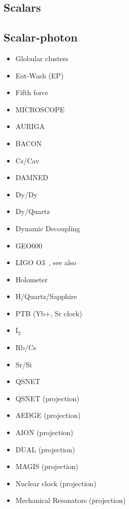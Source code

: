 \documentclass[8pt,twocolumn]{extarticle}
\begin{document}
\begin{mdframed}
\vspace{-1em}
\section{Scalars}\vspace{-0.5em}

\subsection*{Scalar-photon}\vspace{-0.5em}
\begin{itemize}\setlength\itemsep{-0.5em}
	\item Globular clusters~\cite{Dolan:2022kul}
	\item Eot-Wash (EP)~\cite{Hees:2018fpg}
	\item Fifth force~\cite{Adelberger:2003zx,Fischbach:1996eq,Fienga:2023ocw,Mars}
	\item MICROSCOPE~\cite{Berge:2017ovy}
	\item AURIGA~\cite{Branca:2016rez}
	\item BACON~\cite{BACON}
	\item Cs/Cav~\cite{Tretiak:2022ndx}
	\item DAMNED~\cite{Savalle:2020vgz}
	\item Dy/Dy~\cite{VanTilburg:2015oza}
	\item Dy/Quartz~\cite{Zhang:2022ewz}
	\item Dynamic Decoupling~\cite{Aharony:2019iad}
	\item GEO600~\cite{Vermeulen:2021epa}
	\item LIGO O3~\cite{Gottel:2024cfj}, see also~\cite{Fukusumi:2023kqd}
	\item Holometer~\cite{Aiello:2021wlp}
	\item H/Quartz/Sapphire~\cite{Campbell:2020fvq}
	\item PTB (Yb+, Sr clock)~\cite{Filzinger:2023zrs}
	\item I$_2$~\cite{Oswald:2021vtc}
	\item Rb/Cs~\cite{Hees:2016gop}
	\item Sr/Si~\cite{Kennedy:2020bac}
	\item QSNET~\cite{Sherrill:2023zah}
	\item QSNET (projection)~\cite{Barontini:2021mvu}
	\item AEDGE (projection)~\cite{Badurina:2021rgt}
	\item AION (projection)~\cite{Badurina:2021rgt}
	\item DUAL (projection)~\cite{Arvanitaki:2015iga}
	\item MAGIS (projection)~\cite{MAGIS}
	\item Nuclear clock (projection)~\cite{Antypas:2022asj}
	\item Mechanical Resonators (projection)~\cite{Manley:2019vxy}
\end{itemize}
\vspace{-2em}


\end{mdframed}
\end{document}
